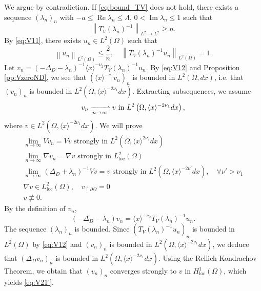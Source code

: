 \documentclass[10pt,leqno]{amsart}
\DeclareMathOperator{\im}{Im} %
\DeclareMathOperator{\re}{Re} %
\theoremstyle{definition}%
\theoremstyle{remark}
\numberwithin{equation}{section}
\renewcommand{\^}{\widehat}%
\begin{document}
 
 We argue by contradiction. If \eqref{eq:bound_TV} does not hold, there exists a sequence $(\lambda_n)_n$ with $-a\leq \re \lambda_n\leq \Lambda$, $0<\im \lambda_n\leq 1$ such that 
\begin{equation}
\label{eq:V11} 
\left\| T_V(\lambda_n)^{-1}\right\|_{L^2\to L^2} \geq n.
\end{equation} 
By \eqref{eq:V11}, there exists $u_n\in L^2(\Omega)$ such that 
\begin{equation}
\label{eq:V12}
\left\|u_n\right\|_{L^2(\Omega)}\leq \frac{2}{n},\quad \left\|T_V(\lambda_n)^{-1}u_n\right\|_{L^2(\Omega)}=1.
\end{equation} 
Let $v_n=\left( -\Delta_D-\lambda_n \right)^{-1}\langle x\rangle^{-\nu_2} T_V(\lambda_n)^{-1}u_n$. By \eqref{eq:V12} and Proposition \ref{pp:VzeroND}, we see that $(\langle x\rangle^{-\nu_1}v_n)_n$ is bounded in $L^2(\Omega,dx)$, i.e. that $(v_n)_n$ is bounded in $L^2\left(\Omega,\langle x\rangle^{-2\nu_1}dx\right)$. Extracting subsequences, we assume 
\begin{equation}
\label{eq:V20} 
v_n\xrightharpoonup[n\to\infty]{} v\text{ in }L^2\left(\Omega,\langle x\rangle^{-2\nu_1}dx\right),
\end{equation} 
where $v\in L^2\left(\Omega,\langle x\rangle^{-2\nu_1}dx\right)$. We will prove
\begin{gather}
\label{eq:V21} \lim_{n\to\infty} Vv_n=Vv \text{ strongly in }L^2\left(\Omega,\langle x\rangle^{2\nu_2}dx\right)\\
\label{eq:V21'} \lim_{n\to\infty} \nabla v_n=\nabla v\text{ strongly in }L^2_{\mathrm{\mathrm{loc}}}(\Omega)\\
\label{eq:V22}\lim_{n\to\infty} (\Delta_D+\lambda_n)^{-1} Vv=v\text{ strongly in }L^2\left(\Omega, \langle x\rangle^{-2\nu'}dx \right), \quad \forall \nu'>\nu_1\\
\label{eq:V23} \nabla v\in L^2_{\mathrm{\mathrm{loc}}}(\Omega),\quad v_{\restriction\partial \Omega}=0\\
\label{eq:V24}
v\not \equiv 0.
\end{gather}
By the definition of $v_n$, 
\begin{equation}
\label{eq:equation_vn}
(-\Delta_D-\lambda_n)v_n=\langle x\rangle^{-\nu_2} T_V(\lambda_n)^{-1}u_n. 
\end{equation} 
The sequence $(\lambda_n)_n$ is bounded. Since $(T_V(\lambda_n)^{-1}u_n)_n$ is bounded in $L^2(\Omega)$ by \eqref{eq:V12} and $(v_n)_n$ is bounded in $L^2(\Omega,\langle x\rangle^{-2\nu_1}dx)$, we deduce that $(\Delta_Dv_n)_n$ is bounded in $L^2(\Omega,\langle x\rangle^{-2\nu_1}dx)$. Using the Rellich-Kondrachov Theorem, we obtain that $(v_n)_n$ converges strongly to $v$ in $H^1_{\mathrm{\mathrm{loc}}}(\Omega)$, which yields \eqref{eq:V21'}. 
\end{document}
